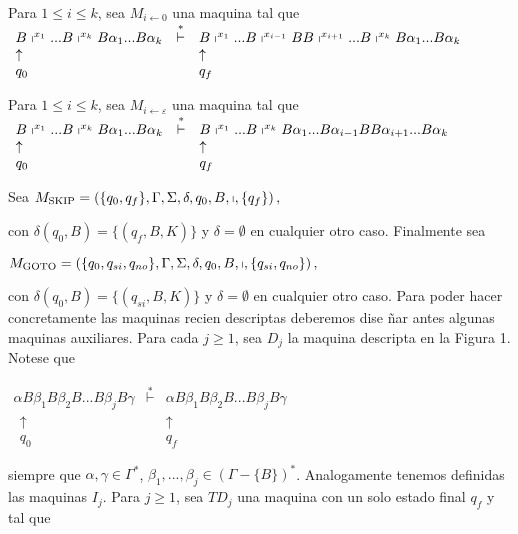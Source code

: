   Para $1\leq i\leq k$, sea $M_{i\leftarrow 0}$ una maquina tal que
  $\displaystyle \begin{array}{lcl} B\shortmid ^{x_{1}}...B\shortmid ^{x_{k}}B\alpha _{1}...B\alpha _{k} & \overset{\ast }{\vdash } & B\shortmid ^{x_{1}}...B\shortmid ^{x_{i-1}}BB\shortmid ^{x_{i+1}}...B\shortmid ^{x_{k}}B\alpha _{1}...B\alpha _{k} \\ \uparrow & & \uparrow \\ q_{0} & & q_{f} \end{array} $

  Para $1\leq i\leq k$, sea $M_{i\leftarrow \varepsilon }$ una maquina tal que
  $\displaystyle \begin{array}{lcl} B\shortmid ^{x_{1}}...B\shortmid ^{x_{k}}B\alpha _{1}...B\alpha _{k} & \overset{\ast }{\vdash } & B\shortmid ^{x_{1}}...B\shortmid ^{x_{k}}B\alpha _{1}...B\alpha _{i-1}BB\alpha _{i+1}...B\alpha _{k} \\ \uparrow & & \uparrow \\ q_{0} & & q_{f} \end{array} $

  Sea
  $\displaystyle M_{\mathrm{SKIP}}=\left( \{q_{0},q_{f}\},\Gamma ,\Sigma ,\delta ,q_{0},B,\shortmid ,\{q_{f}\}\right) , $

  con $\delta (q_{0},B)=\{(q_{f},B,K)\}$ y $\delta =\emptyset $ en cualquier otro caso.
  Finalmente sea

  $\displaystyle M_{\mathrm{GOTO}}=\left( \{q_{0},q_{si},q_{no}\},\Gamma ,\Sigma ,\delta ,q_{0},B,\shortmid ,\{q_{si},q_{no}\}\right) , $

  con $\delta (q_{0},B)=\{(q_{si},B,K)\}$ y $\delta =\emptyset $ en cualquier otro caso.
  Para poder hacer concretamente las maquinas recien descriptas deberemos dise \~{n}ar antes algunas maquinas auxiliares. Para cada $j\geq 1$, sea $D_{j}$ la maquina descripta en la Figura 1. Notese que

  $\displaystyle \begin{array}{lcr} \alpha B\beta _{1}B\beta _{2}B...B\beta _{j}B\gamma & \overset{\ast }{\vdash } & \alpha B\beta _{1}B\beta _{2}B...B\beta _{j}B\gamma \\ \ \ \uparrow & & \uparrow \ \ \\ \ \ q_{0} & & q_{f}\ \ \end{array} $

  siempre que $\alpha ,\gamma \in \Gamma ^{\ast }$, $\beta _{1},...,\beta _{j}\in (\Gamma -\{B\})^{\ast }$. Analogamente tenemos definidas las maquinas $I_{j}.$
  Para $j\geq 1$, sea $TD_{j}$ una maquina con un solo estado final $q_{f}$ y tal que

